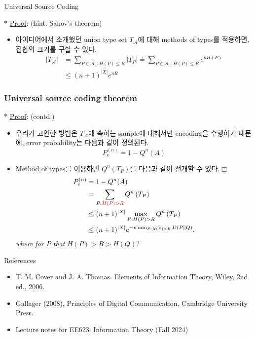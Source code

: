 \documentclass[9pt]{beamer}
\begin{document}
\begin{section}{Universal Source Coding}
\begin{frame}
\begin{theorem}
            \end{theorem}
            \vspace{0.2cm}
            $\ast$ \underline{Proof}: (hint. Sanov's theorem)
            \begin{itemize}
                \item 아이디어에서 소개했던 union type set $T_{\mathcal A}$에 대해 methods of types를 적용하면, 집합의 크기를 구할 수 있다.
                $$ \begin{aligned}
                    |T_{\mathcal A} | & =\sum_{P \in \mathcal{A}_n: H(P) \leq R}\left|T_P\right| \doteq \sum_{P \in \mathcal{A}_n: H(P) \leq R} e^{n H(P)} \\
                    & \leq(n+1)^{|X|} e^{n R}
                    \end{aligned} $$
            \end{itemize}
        \end{frame}

        \begin{frame}
            \frametitle{Universal source coding theorem}
            $\ast$ \underline{Proof}: (contd.)
            \begin{itemize}
                \item 우리가 고안한 방법은 $T_{\mathcal A}$에 속하는 sample에 대해서만 encoding을 수행하기 때문에, error probability는 다음과 같이 정의된다.
                $$ P_e^{(n)} =1-Q^n(A)  $$
                \item Method of types를 이용하면 $Q^n (T_P)$를 다음과 같이 전개할 수 있다.$\Box$
                $$ \begin{aligned}
                    P_e^{(n)} & =1-Q^n(A) \\
                    & =\sum_{P: {\color{red}H(P)>R}} Q^n\left(T_P\right) \\
                    & \leq(n+1)^{|X|} \max _{P: H(P)>R} Q^n\left(T_P\right) \\
                    & \leq(n+1)^{|X|} e^{-n \min _{P:  H(P)>R} D(P \| Q)} .
                    \end{aligned} $$
                \textit{where for $P$ that } $H(P) > R> H(Q)$?
            \end{itemize}
        \end{frame}


    \end{section}

    \begin{frame}{References}
        \begin{itemize}
            \item T. M. Cover and J. A. Thomas. Elements of Information Theory, Wiley, 2nd ed., 2006.
            \item Gallager (2008), Principles of Digital Communication, Cambridge University Press.
            \item Lecture notes for EE623: Information Theory (Fall 2024)
        \end{itemize}
        \vspace{6cm}
    \end{frame}
\end{document}
